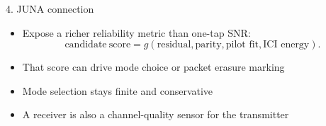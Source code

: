 \documentclass[aspectratio=169,10pt]{beamer}
\begin{document}
\begin{frame}{4. JUNA connection}
\begin{itemize}\setlength{\itemsep}{0.5em}
  \item Expose a richer reliability metric than one-tap SNR:
  \[
    \mathrm{candidate\ score}
    =
    g(\text{residual},\text{parity},\text{pilot fit},\text{ICI energy}).
  \]
  \item That score can drive mode choice or packet erasure marking
  \item Mode selection stays finite and conservative
  \item A receiver is also a channel-quality sensor for the transmitter
\end{itemize}
\end{frame}
\end{document}
